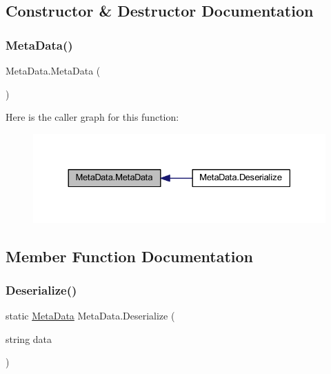 \subsection{Constructor \& Destructor Documentation}
\mbox{\label{class_meta_data_a51477d7066b8b3e42d41236f62ef5f36}} 
\subsubsection{\texorpdfstring{Meta\+Data()}{MetaData()}}
{\footnotesize\ttfamily Meta\+Data.\+Meta\+Data (\begin{DoxyParamCaption}{ }\end{DoxyParamCaption})}

Here is the caller graph for this function\+:
\nopagebreak
\begin{figure}[H]
\begin{center}
\leavevmode
\includegraphics[width=330pt]{class_meta_data_a51477d7066b8b3e42d41236f62ef5f36_icgraph}
\end{center}
\end{figure}


\subsection{Member Function Documentation}
\mbox{\label{class_meta_data_adcfb4cc074566933e35c3f14451960ed}} 
\subsubsection{\texorpdfstring{Deserialize()}{Deserialize()}}
{\footnotesize\ttfamily static \mbox{\hyperlink{class_meta_data}{Meta\+Data}} Meta\+Data.\+Deserialize (\begin{DoxyParamCaption}\item[{string}]{data }\end{DoxyParamCaption})\hspace{0.3cm}{\ttfamily [static]}}


